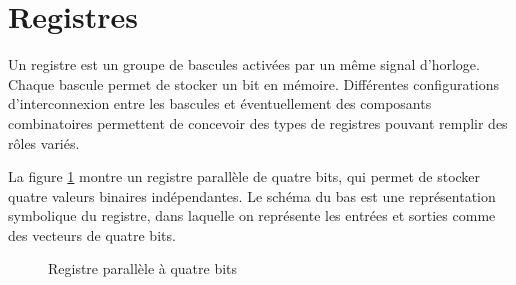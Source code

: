 \documentclass[letter, oneside]{book}
\begin{document}
\section{Registres}
\label{sec:org009b5e9}

Un registre est un groupe de bascules activées par un même signal
d'horloge. Chaque bascule permet de stocker un bit en
mémoire. Différentes configurations d'interconnexion entre les
bascules et éventuellement des composants combinatoires permettent de
concevoir des types de registres pouvant remplir des rôles variés.

La figure \ref{fig:org9c2bcf5} montre un registre parallèle de quatre bits,
qui permet de stocker quatre valeurs binaires indépendantes. Le schéma
du bas est une représentation symbolique du registre, dans laquelle on
représente les entrées et sorties comme des vecteurs de quatre bits.

\begin{figure}[htbp]
\centering

\caption{\label{fig:org9c2bcf5}Registre parallèle à quatre bits}
\end{figure}
\end{document}
